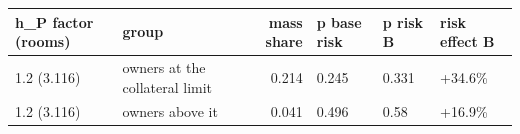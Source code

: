 \begingroup\small
\setlength{\tabcolsep}{3pt}
\renewcommand{\arraystretch}{1.04}
\begin{tabularx}{\linewidth}{XXrXXX}
\toprule
h\_P factor (rooms) & group & mass share & p base risk & p risk B & risk effect B \\
\midrule
1.2 (3.116) & owners at the collateral limit & 0.214 & 0.245 & 0.331 & +34.6\% \\
1.2 (3.116) & owners above it & 0.041 & 0.496 & 0.58 & +16.9\% \\
\bottomrule
\end{tabularx}
\endgroup
